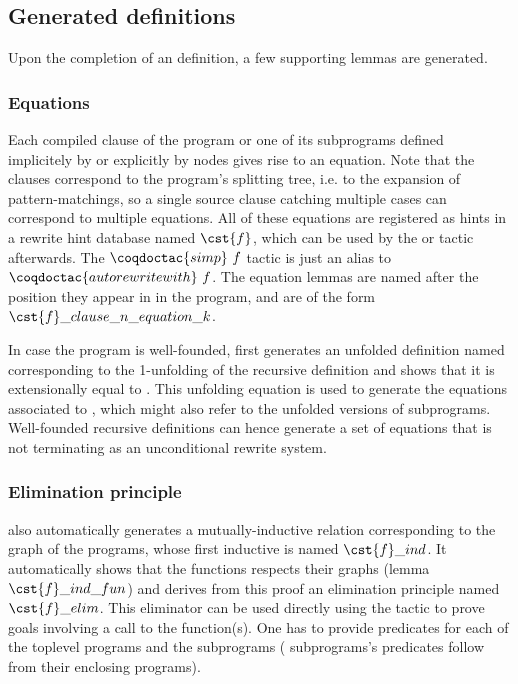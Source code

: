 \subsection{Generated definitions}

Upon the completion of an \Equations definition, a few supporting lemmas
are generated.

\subsubsection{Equations}

Each compiled clause of the program or one
of its subprograms defined implicitely by  or explicitly by
 nodes gives rise to an equation. Note that the clauses
correspond to the program's splitting tree, i.e. to the expansion of
pattern-matchings, so a single source clause catching multiple cases
can correspond to multiple equations. All of these equations are
registered as hints in a rewrite hint database named $\cst{f}$, which can be
used by the  or  tactic
afterwards. The $\coqdoctac{simp}~f$ tactic is just an alias to
$\coqdoctac{autorewrite with}~f$. The equation lemmas are named
after the position they appear in in the program, and are of the
form $\cst{f}\_clause\_n\_equation\_k$.

In case the program is well-founded, \Equations first generates an
unfolded definition named  corresponding to the
1-unfolding of the recursive definition and shows that it is
extensionally equal to . This unfolding equation is used
to generate the equations associated to , which might also
refer to the unfolded versions of subprograms. Well-founded
recursive definitions can hence generate a set of equations that
is not terminating as an unconditional rewrite system.

\subsubsection{Elimination principle}

\Equations also automatically generates a mutually-inductive relation
corresponding to the graph of the programs, whose first inductive is named
$\cst{f}\_ind$. It automatically shows that the functions respects their
graphs (lemma $\cst{f}\_ind\_fun$) and derives from this proof an
elimination principle named $\cst{f}\_elim$. This eliminator can be used
directly using the  tactic to prove goals involving a call to
the function(s). One has to provide predicates for each of the toplevel
programs and the  subprograms ( subprograms's
predicates follow from their enclosing programs).

